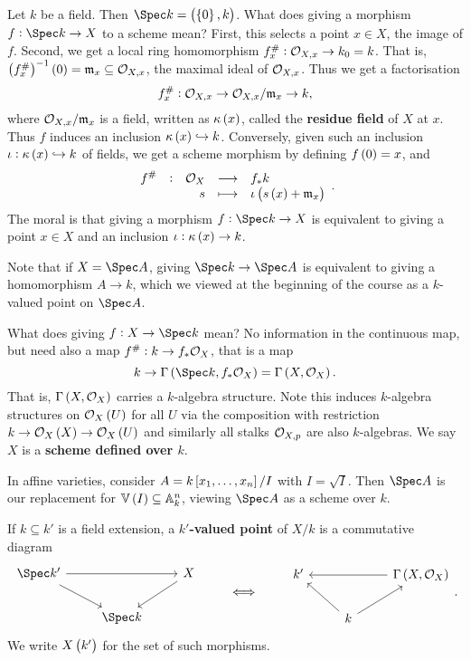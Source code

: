 Let $ k $ be a field. Then $ \Spec k = \br{\cbr{0}, k} $. What does giving a morphism $ f : \Spec k \to X $ to a scheme mean? First, this selects a point $ x \in X $, the image of $ f $. Second, we get a local ring homomorphism $ f_x^\# : \mathcal{O}_{X, x} \to k_0 = k $. That is, $ \br{f_x^\#}^{-1}\br{0} = \mmm_x \subseteq \OOO_{X, x} $, the maximal ideal of $ \mathcal{O}_{X, x} $. Thus we get a factorisation
$$ f_x^\# : \mathcal{O}_{X, x} \to \mathcal{O}_{X, x} / \mathfrak{m}_x \to k, $$
where $ \mathcal{O}_{X, x} / \mathfrak{m}_x $ is a field, written as $ \kappa\br{x} $, called the \textbf{residue field} of $ X $ at $ x $. Thus $ f $ induces an inclusion $ \kappa\br{x} \hookrightarrow k $. Conversely, given such an inclusion $ \iota : \kappa\br{x} \hookrightarrow k $ of fields, we get a scheme morphism by defining $ f\br{0} = x $, and
$$ \function[f^\#]{\OOO_X}{f_*k}{s}{\iota\br{s\br{x} + \mmm_x}}. $$
The moral is that giving a morphism $ f : \Spec k \to X $ is equivalent to giving a point $ x \in X $ and an inclusion $ \iota : \kappa\br{x} \to k $.

\begin{example*}
Note that if $ X = \Spec A $, giving $ \Spec k \to \Spec A $ is equivalent to giving a homomorphism $ A \to k $, which we viewed at the beginning of the course as a $ k $-valued point on $ \Spec A $.
\end{example*}


What does giving $ f : X \to \Spec k $ mean? No information in the continuous map, but need also a map $ f^\# : k \to f_*\mathcal{O}_X $, that is a map
$$ k \to \Gamma\br{\Spec k, f_*\OOO_X} = \Gamma\br{X, \OOO_X}. $$
That is, $ \Gamma\br{X, \OOO_X} $ carries a $ k $-algebra structure. Note this induces $ k $-algebra structures on $ \OOO_X\br{U} $ for all $ U $ via the composition with restriction $ k \to \OOO_X\br{X} \to \OOO_X\br{U} $ and similarly all stalks $ \mathcal{O}_{X, p} $ are also $ k $-algebras. We say $ X $ is a \textbf{scheme defined over $ k $}.

\begin{example*}
In affine varieties, consider $ A = k\sbr{x_1, \dots, x_n} / I $ with $ I = \sqrt{I} $. Then $ \Spec A $ is our replacement for $ \VV\br{I} \subseteq \AA_k^n $, viewing $ \Spec A $ as a scheme over $ k $.
\end{example*}

If $ k \subseteq k' $ is a field extension, a \textbf{$ k' $-valued point} of $ X / k $ is a commutative diagram
$$
\begin{tikzcd}
\Spec k' \arrow{rr} \arrow{dr} & & X \arrow{dl} \\
& \Spec k &
\end{tikzcd}
\qquad \iff \qquad
\begin{tikzcd}
k' & & \Gamma\br{X, \OOO_X} \arrow{ll} \\
& k \arrow{ul} \arrow{ur} &
\end{tikzcd}.
$$
We write $ X\br{k'} $ for the set of such morphisms.

